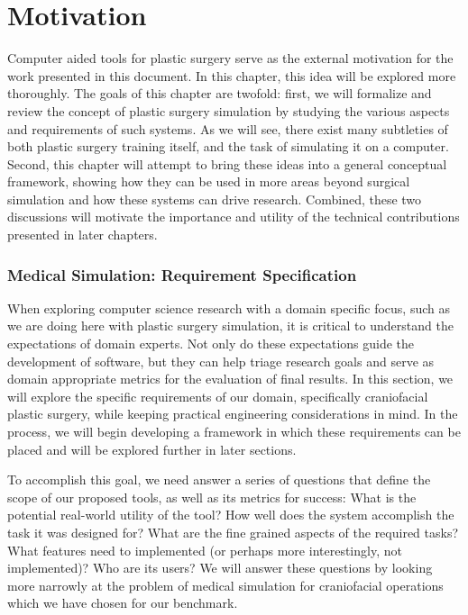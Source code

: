 
\chapter{Motivation}
\label{chp:motivation}

Computer aided tools for plastic surgery serve as the external
motivation for the work presented in this document. In this chapter,
this idea will be explored more thoroughly. The goals of this chapter
are twofold: first, we will formalize and review the concept of
plastic surgery simulation by studying the various aspects and
requirements of such systems. As we will see, there exist many
subtleties of both plastic surgery training itself, and the task of
simulating it on a computer. Second, this chapter will attempt to
bring these ideas into a general conceptual framework, showing how
they can be used in more areas beyond surgical simulation and how
these systems can drive research. Combined, these two discussions will
motivate the importance and utility of the technical contributions
presented in later chapters.

\subsection{Medical Simulation: Requirement Specification}

When exploring computer science research with a domain specific focus,
such as we are doing here with plastic surgery simulation, it is
critical to understand the expectations of domain experts. Not only do
these expectations guide the development of software, but they can
help triage research goals and serve as domain appropriate metrics for
the evaluation of final results. In this section, we will explore the
specific requirements of our domain, specifically craniofacial plastic
surgery, while keeping practical engineering considerations in
mind. In the process, we will begin developing a framework in
which these requirements can be placed and will be explored further in
later sections.

To accomplish this goal, we need answer a series of questions that
define the scope of our proposed tools, as well as its metrics for
success: What is the potential real-world utility of the tool? How
well does the system accomplish the task it was designed for?  What
are the fine grained aspects of the required tasks? What features need
to implemented (or perhaps more interestingly, not implemented)? Who
are its users? We will answer these questions by looking more narrowly
at the problem of medical simulation for craniofacial operations which
we have chosen for our benchmark.

